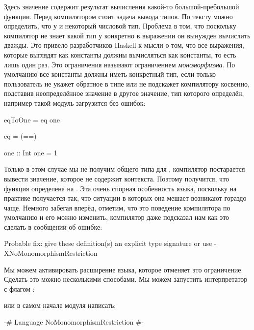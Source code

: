 Здесь значение  содержит результат вычисления
какой-то большой-пребольшой функции. Перед компилятором 
стоит задача вывода типов. По тексту можно определить,
что у  и  некоторый числовой тип. 
Проблема в том, что поскольку компилятор не знает какой тип
у  конкретно в выражении  он вынужден
вычислить  дважды. Это привело разработчиков 
Haskell к мысли о том, что все выражения, которые
выглядят как константы должны вычисляться как константы,
то есть лишь один раз. 
Это ограничения называют ограничением \emph{мономорфизма}.
По умолчанию все константы должны иметь конкретный тип, если 
только пользователь не укажет обратное в типе
или не подскажет компилятору косвенно, подставив
неопределённое значение в другое значение, тип которого
определён, например такой модуль загрузится без ошибок:

\begin{code}
eqToOne = eq one

eq = (==)

one :: Int
one = 1
\end{code}

Только в этом случае мы не получим общего типа для 
, компилятор постарается вывести значение,
которое не содержит контекста. Поэтому получится, что
функция   определена на .
Эта очень спорная особенность языка, поскольку
на практике получается так, что ситуации в которых
она мешает возникают гораздо чаще. Немного забегая вперёд, отметим, что
это поведение компилятора по умолчанию и его можно
изменить, компилятор даже подсказал нам как это сделать
в сообщении об ошибке:

\begin{code}
    Probable fix: give these definition(s) an explicit type signature
                  or use -XNoMonomorphismRestriction
\end{code}

Мы можем активировать расширение языка, которое отменяет
это ограничение. Сделать это можно несколькими способами.
Мы можем запустить интерпретатор с флагом :


\noindent или в самом начале модуля написать:

\begin{code}
{-# Language NoMonomorphismRestriction #-}
\end{code}

